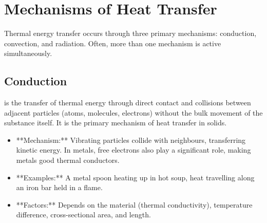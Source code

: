 
\FloatBarrier

\section{Mechanisms of Heat Transfer}
\label{sec:heat_transfer_mechanisms}
\FloatBarrier

Thermal energy transfer occurs through three primary mechanisms: conduction, convection, and radiation. Often, more than one mechanism is active simultaneously.


\subsection{Conduction}
\FloatBarrier %

 is the transfer of thermal energy through direct contact and collisions between adjacent particles (atoms, molecules, electrons) without the bulk movement of the substance itself. It is the primary mechanism of heat transfer in solids.
\begin{itemize}
    \item **Mechanism:** Vibrating particles collide with neighbours, transferring kinetic energy. In metals, free electrons also play a significant role, making metals good thermal conductors.
    \item **Examples:** A metal spoon heating up in hot soup, heat travelling along an iron bar held in a flame.
    \item **Factors:** Depends on the material (thermal conductivity), temperature difference, cross-sectional area, and length.
\end{itemize}

